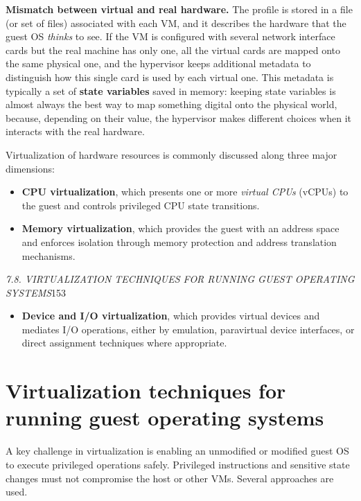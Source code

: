 \begin{notebox}
	\textbf{Mismatch between virtual and real hardware.} The profile is stored in a file (or set of files) associated with each VM, and it describes the hardware that the guest OS \emph{thinks} to see. If the VM is configured with several network interface cards but the real machine has only one, all the virtual cards are mapped onto the same physical one, and the hypervisor keeps additional metadata to distinguish how this single card is used by each virtual one. This metadata is typically a set of \textbf{state variables} saved in memory: keeping state variables is almost always the best way to map something digital onto the physical world, because, depending on their value, the hypervisor makes different choices when it interacts with the real hardware.
\end{notebox}

Virtualization of hardware resources is commonly discussed along three major dimensions:

\begin{itemize}
\item \textbf{CPU virtualization}, which presents one or more \emph{virtual CPUs} (vCPUs) to the guest and controls privileged CPU state transitions.
\item \textbf{Memory virtualization}, which provides the guest with an address space and enforces isolation through memory protection and address translation mechanisms.
\end{itemize}

\emph{7.8. VIRTUALIZATION TECHNIQUES FOR RUNNING GUEST OPERATING SYSTEMS}153

\begin{itemize}
\item \textbf{Device and I/O virtualization}, which provides virtual devices and mediates I/O operations, either by emulation, paravirtual device interfaces, or direct assignment techniques where appropriate.
\end{itemize}

\section{Virtualization techniques for running guest operating systems}

A key challenge in virtualization is enabling an unmodified or modified guest OS to execute privileged operations safely. Privileged instructions and sensitive state changes must not compromise the host or other VMs. Several approaches are used.

